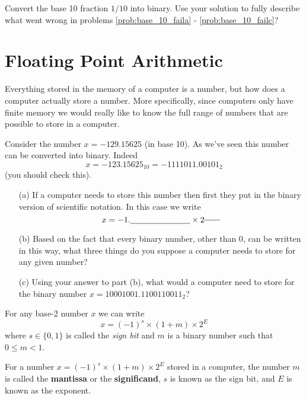 \begin{problem}
    Convert the base 10 fraction $1/10$ into binary.  Use your solution to fully describe
    what went wrong in problems \ref{prob:base_10_faila} - \ref{prob:base_10_failc}?
\end{problem}



\newpage\section{Floating Point Arithmetic}
Everything stored in the memory of a computer is a number, but how does a computer
actually store a number.  More specifically, since computers only have finite memory we
would really like to know the full range of numbers that are possible to store in a
computer.  

\begin{problem}
    Consider the number $x = -129.15625$ (in base 10).  As we've seen this number can be
    converted into binary.  Indeed
    \[ x = -123.15625_{10} = -1111011.00101_2 \]
    (you should check this).  
    \begin{enumerate}
        \item[(a)] If a computer needs to store this number then first they put in the
            binary version of scientific notation.  In this case we write 
            \[ x = -1. \underline{\hspace{1in}} \times 2^{\underline{\hspace{0.25in}}} \]
            \solution{
                \[ -1.11101100101 \times 2^{6} \]
                }
        \item[(b)] Based on the fact that every binary number, other than 0, can be
            written in this way, what three things do you suppose a computer needs to
            store for any given number? 
        \item[(c)] Using your answer to part (b), what would a computer need to store for
            the binary number $x=10001001.1100110011_2$?
    \end{enumerate}
\end{problem}

For any base-2 number $x$ we can write
\[ x = (-1)^{s} \times (1+ m) \times 2^E \]
where $s \in \{0,1\}$ is called the {\it sign bit} and $m$ is a binary number such that $0
\le m < 1$.
\begin{definition}
    For a number $x = (-1)^{s} \times (1+m) \times 2^E$ stored in a computer, the number $m$
    is called the {\bf mantissa} or the {\bf significand}, $s$ is known as the sign bit,
    and $E$ is known as the exponent.
\end{definition}

